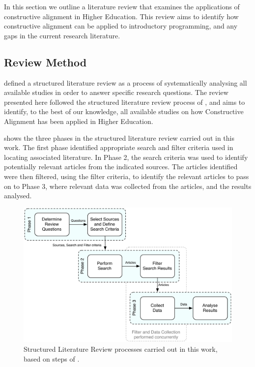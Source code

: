 In this section we outline a literature review that examines the applications of constructive alignment in Higher Education. This review aims to identify how constructive alignment can be applied to introductory programming, and any gaps in the current research literature. 

\subsection{Review Method} %
\label{sub:review_method}

\citet{Petticrew:2008} defined a structured literature review as a process of systematically analysing all available studies in order to answer specific research questions. The review presented here followed the structured literature review process of \citet{Kitchenham:2004}, and aims to identify, to the best of our knowledge, all available studies on how Constructive Alignment has been applied in Higher Education.

 shows the three phases in the structured literature review carried out in this work. The first phase identified appropriate search and filter criteria used in locating associated literature. In Phase 2, the search criteria was used to identify potentially relevant articles from the indicated sources. The articles identified were then filtered, using the filter criteria, to identify the relevant articles to pass on to Phase 3, where relevant data was collected from the articles, and the results analysed.

\begin{figure}[tbph]
	\centering
	\includegraphics[width=\textwidth]{SystematicReview}
	\caption{Structured Literature Review processes carried out in this work, based on steps of \citet{Kitchenham:2004}.}
	\label{fig:struct_review_proc}
\end{figure}




